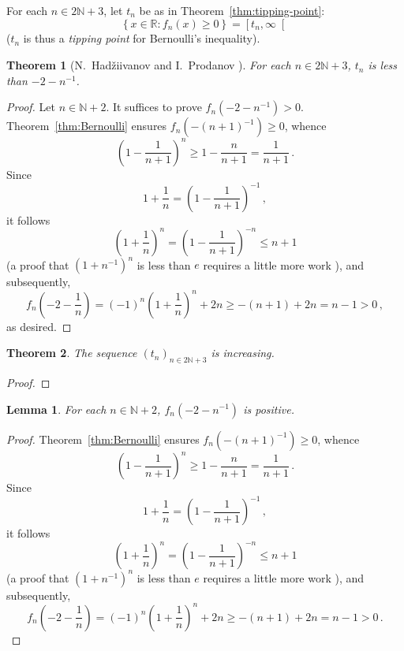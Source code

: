 \documentclass[12pt]{article}
\newcommand{\bR}{\mathbb{R}}
\newcommand{\bN}{\mathbb{N}}
\newcommand{\geint}[1]{\left[ #1, \infty \right[}
\newcommand{\ltint}[1]{\left]- \infty, #1 \right[}
\newtheorem{theorem}{Theorem}
\newtheorem{lemma}{Lemma}
\begin{document}
 For each $n \in 2 \bN + 3$,
 let $t_n$ be as in Theorem~\ref{thm:tipping-point}:
 $$
 \left\{ x \in \bR : f_n(x) \ge 0 \right\}
 = \geint{t_n} 
 $$
 ($t_n$ is thus a \emph{tipping point} for Bernoulli's inequality).
  
 \begin{theorem}[N.~Had\v{z}iivanov and I.~Prodanov \cite{MitrinovicAI,MitrinovicCNIA,MondP94,MitrinovicP93}]
   \label{thm:HP-upper}
   For each $n \in 2 \bN + 3$, $t_n$ is less than $- 2 - n^{-1}$.
 \end{theorem}

 \begin{proof}
   Let $n \in \bN + 2$.
   It suffices to prove $f_n(- 2 - n^{-1}) > 0$.
   Theorem~\ref{thm:Bernoulli} ensures $f_n(- {(n + 1)}^{-1}) \ge 0$, whence
   $$
   \left( 1 - \frac{1}{n + 1} \right)^n \ge 1 - \frac{n}{n + 1} = \frac{1}{n + 1} \, .
   $$
   Since 
   $$
   1 + \frac{1}{n} = \left( 1 - \frac{1}{n + 1} \right)^{-1} \,,
   $$
   it follows 
   $$
  \left( 1 + \frac{1}{n} \right)^n = \left( 1 - \frac{1}{n + 1} \right)^{-n}  \le n + 1 
  $$
  (a proof that ${(1 + n^{-1} )}^n$ is less than $e$ requires a little more work \cite{Wiener85}),
  and subsequently,
  $$
  f_n \left(- 2 - \frac{1}{n} \right) = {(- 1)}^n \left( 1 + \frac{1}{n} \right)^n + 2 n \ge - (n + 1) + 2 n = n - 1 > 0 \,,
  $$
  as desired.
 \end{proof} 
 
 
\begin{theorem}
  The sequence $\left( t_n \right)_{n \in 2 \bN + 3}$ is increasing.
 \end{theorem} 

 \begin{proof}
 \end{proof}
 \begin{lemma} \label{lem:fun-positive}
   For each $n \in \bN + 2$, $f_n(- 2 - n^{-1})$ is positive.
 \end{lemma}
 
 \begin{proof}
   Theorem~\ref{thm:Bernoulli} ensures $f_n(- {(n + 1)}^{-1}) \ge 0$, whence
   $$
   \left( 1 - \frac{1}{n + 1} \right)^n \ge 1 - \frac{n}{n + 1} = \frac{1}{n + 1} \, .
   $$
   Since 
   $$
   1 + \frac{1}{n} = \left( 1 - \frac{1}{n + 1} \right)^{-1} \,,
   $$
   it follows 
   $$
  \left( 1 + \frac{1}{n} \right)^n = \left( 1 - \frac{1}{n + 1} \right)^{-n}  \le n + 1 
  $$
  (a proof that ${(1 + n^{-1} )}^n$ is less than $e$ requires a little more work \cite{Wiener85}),
  and subsequently,
  $$
  f_n \left(- 2 - \frac{1}{n} \right) = {(- 1)}^n \left( 1 + \frac{1}{n} \right)^n + 2 n \ge - (n + 1) + 2 n = n - 1 > 0 \,.
  $$
\end{proof}
\end{document}
